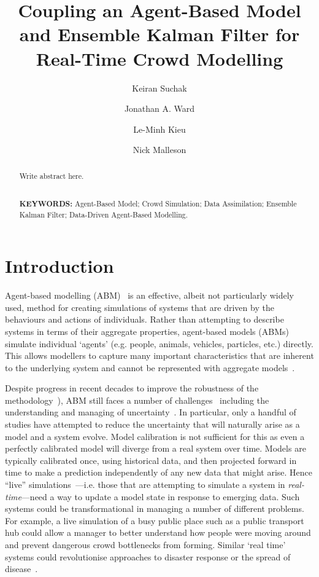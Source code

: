\documentclass{article}
\title{Coupling an Agent-Based Model and Ensemble Kalman Filter for Real-Time Crowd Modelling}
\author{Keiran Suchak \and  Jonathan A. Ward \and Le-Minh Kieu \and Nick Malleson}
\begin{document}
\maketitle{}

\begin{abstract}
    Write abstract here.
    
    $ $ \\ {\bf KEYWORDS:} Agent-Based Model; Crowd Simulation; Data Assimilation; Ensemble Kalman Filter; Data-Driven Agent-Based Modelling.
    
\end{abstract}



\section{Introduction}\label{sec:intro}

Agent-based modelling (ABM)~\citep{epstein_growing_1996, bonabeau_agent_2002} is an effective, albeit not particularly widely used, method for creating simulations of systems that are driven by the behaviours and actions of individuals. Rather than attempting to describe systems in terms of their aggregate properties, agent-based models (ABMs) simulate individual `agents' (e.g. people, animals, vehicles, particles, etc.) directly. This allows modellers to capture many important characteristics that are inherent to the underlying system and cannot be represented with aggregate models~\citep{an_challenges_2021, heppenstall_agentbased_2012}.

Despite progress in recent decades to improve the robustness of the methodology~\citep[e.g.][]{thiele_facilitating_2014}), ABM still faces a number of challenges~\citep[for example see][]{an_challenges_2021, filatova_spatial_2013, lippe_using_2019} including the understanding and managing of uncertainty~\citep{kieu_dealing_2020}. In particular, only a handful of studies have attempted to reduce the uncertainty that will naturally arise as a model and a system evolve. Model calibration is not sufficient for this as even a perfectly calibrated model will diverge from a real system over time.   Models are typically calibrated once, using historical data, and then projected forward in time to make a prediction independently of any new data that might arise. Hence ``live'' simulations~\cite{swarup_live_2020}---i.e. those that are attempting to simulate a system in \textit{real-time}---need a way to update a model state in response to emerging data. Such systems could be transformational in managing a number of different problems. For example, a live simulation of a busy public place such as a public transport hub could allow a manager to better understand how people were moving around and prevent dangerous crowd bottlenecks from forming. Similar `real time' systems could revolutionise approaches to disaster response or the spread of disease~\citep{swarup_live_2020}.
\end{document}
